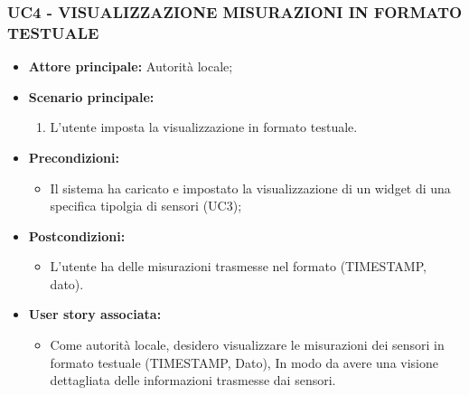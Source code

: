 \subsubsection{UC4 - VISUALIZZAZIONE MISURAZIONI IN FORMATO TESTUALE}
\begin{itemize}
    \item \textbf{Attore principale:} Autorità locale;
    \item \textbf{Scenario principale:}
          \begin{enumerate}
              \item L'utente imposta la visualizzazione in formato testuale.
          \end{enumerate}
    \item \textbf{Precondizioni:}
          \begin{itemize}
            \item Il sistema ha caricato e impostato la visualizzazione di un widget di una specifica tipolgia di sensori (UC3);
          \end{itemize}
    \item \textbf{Postcondizioni:}
          \begin{itemize}
              \item  L'utente ha delle misurazioni trasmesse nel formato (TIMESTAMP, dato).
          \end{itemize}
    \item \textbf{User story associata:}
          \begin{itemize}
              \item Come autorità locale,
                    desidero visualizzare le misurazioni dei sensori in formato testuale (TIMESTAMP, Dato),
                    In modo da avere una visione dettagliata delle informazioni trasmesse dai sensori.
          \end{itemize}
\end{itemize}